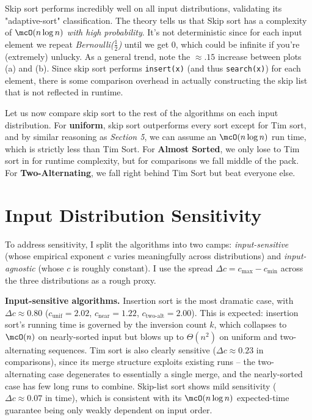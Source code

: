 \documentclass[11pt]{article}
\begin{document}
Skip sort performs incredibly well on all input distributions, validating its "adaptive-sort" classification. The theory tells us that Skip sort has a complexity of $\mcO(n \log n)$ \emph{with high probability}. It's not deterministic since for each input element we repeat \emph{Bernoulli($\frac{1}{2}$)} until we get $0$, which could be infinite if you're (extremely) unlucky. As a general trend, note the $\approx .15$ increase between plots (a) and (b). Since skip sort performs \texttt{insert(x)} (and thus \texttt{search(x)}) for each element, there is some comparison overhead in actually constructing the skip list that is not reflected in runtime.

Let us now compare skip sort to the rest of the algorithms on each input distribution. For \textbf{uniform}, skip sort outperforms every sort except for Tim sort, and by similar reasoning as \emph{Section 5}, we can assume an $\mcO(n \log n)$ run time, which is strictly less than Tim Sort. For \textbf{Almost Sorted}, we only lose to Tim sort in for runtime complexity, but for comparisons we fall middle of the pack. For \textbf{Two-Alternating}, we fall right behind Tim Sort but beat everyone else.

\section{Input Distribution Sensitivity}
To address sensitivity, I split the algorithms into two camps: \emph{input-sensitive} (whose empirical exponent $c$ varies meaningfully across distributions) and \emph{input-agnostic} (whose $c$ is roughly constant). I use the spread $\Delta c = c_{\max} - c_{\min}$ across the three distributions as a rough proxy.

\textbf{Input-sensitive algorithms.} Insertion sort is the most dramatic case, with $\Delta c \approx 0.80$ ($c_{\text{unif}} = 2.02$, $c_{\text{near}} = 1.22$, $c_{\text{two-alt}} = 2.00$). This is expected: insertion sort's running time is governed by the inversion count $k$, which collapses to $\mcO(n)$ on nearly-sorted input but blows up to $\Theta(n^2)$ on uniform and two-alternating sequences. Tim sort is also clearly sensitive ($\Delta c \approx 0.23$ in comparisons), since its merge structure exploits existing runs -- the two-alternating case degenerates to essentially a single merge, and the nearly-sorted case has few long runs to combine. Skip-list sort shows mild sensitivity ($\Delta c \approx 0.07$ in time), which is consistent with its $\mcO(n \log n)$ expected-time guarantee being only weakly dependent on input order.
\end{document}
